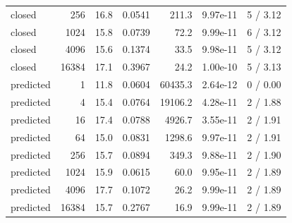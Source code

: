 \begin{tabular}{lrrrrrr}
closed & 256 & 16.8 & 0.0541 & 211.3 & 9.97e-11 & 5 / 3.12 \\
closed & 1024 & 15.8 & 0.0739 & 72.2 & 9.99e-11 & 6 / 3.12 \\
closed & 4096 & 15.6 & 0.1374 & 33.5 & 9.98e-11 & 5 / 3.12 \\
closed & 16384 & 17.1 & 0.3967 & 24.2 & 1.00e-10 & 5 / 3.13 \\
predicted & 1 & 11.8 & 0.0604 & 60435.3 & 2.64e-12 & 0 / 0.00 \\
predicted & 4 & 15.4 & 0.0764 & 19106.2 & 4.28e-11 & 2 / 1.88 \\
predicted & 16 & 17.4 & 0.0788 & 4926.7 & 3.55e-11 & 2 / 1.91 \\
predicted & 64 & 15.0 & 0.0831 & 1298.6 & 9.97e-11 & 2 / 1.91 \\
predicted & 256 & 15.7 & 0.0894 & 349.3 & 9.88e-11 & 2 / 1.90 \\
predicted & 1024 & 15.9 & 0.0615 & 60.0 & 9.95e-11 & 2 / 1.89 \\
predicted & 4096 & 17.7 & 0.1072 & 26.2 & 9.99e-11 & 2 / 1.89 \\
predicted & 16384 & 15.7 & 0.2767 & 16.9 & 9.99e-11 & 2 / 1.89 \\
\bottomrule
\end{tabular}
